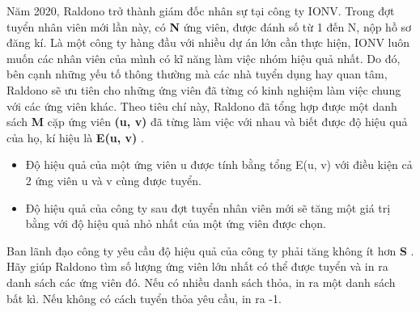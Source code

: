 Năm 2020, Raldono trở thành giám đốc nhân sự tại công ty IONV. Trong đợt tuyển nhân viên mới lần này, có \textbf{ N } ứng viên, được đánh số từ 1 đến N, nộp hồ sơ đăng kí. Là một công ty hàng đầu với nhiều dự án lớn cần thực hiện, IONV luôn muốn các nhân viên của mình có kĩ năng làm việc nhóm hiệu quả nhất. Do đó, bên cạnh những yếu tố thông thường mà các nhà tuyển dụng hay quan tâm, Raldono sẽ ưu tiên cho những ứng viên đã từng có kinh nghiệm làm việc chung với các ứng viên khác. Theo tiêu chí này, Raldono đã tổng hợp được một danh sách \textbf{ M } cặp ứng viên \textbf{ (u, v) } đã từng làm việc với nhau và biết được độ hiệu quả của họ, kí hiệu là \textbf{ E(u, v) } .
\begin{itemize}
	\item Độ hiệu quả của một ứng viên u được tính bằng tổng E(u, v) với điều kiện cả 2 ứng viên u và v cùng được tuyển.
	\item Độ hiệu quả của công ty sau đợt tuyển nhân viên mới sẽ tăng một giá trị bằng với độ hiệu quả nhỏ nhất của một ứng viên được chọn.
\end{itemize}

Ban lãnh đạo công ty yêu cầu độ hiệu quả của công ty phải tăng không ít hơn \textbf{ S } . Hãy giúp Raldono tìm số lượng ứng viên lớn nhất có thể được tuyển và in ra danh sách các ứng viên đó. Nếu có nhiều danh sách thỏa, in ra một danh sách bất kì. Nếu không có cách tuyển thỏa yêu cầu, in ra -1.